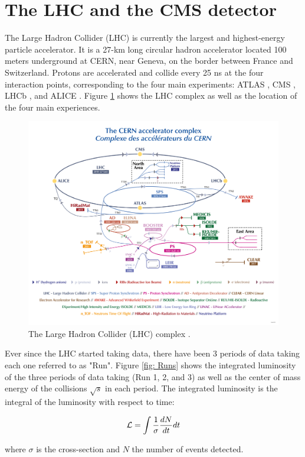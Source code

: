 \section{The LHC and the CMS detector} \label{section: CMS}


The Large Hadron Collider (LHC) is currently the largest and highest-energy particle accelerator. It is a 27-km long circular hadron accelerator located 100 meters underground at CERN, near Geneva, on the border between France and Switzerland. Protons are accelerated and collide every 25 ns at the four interaction points, corresponding to the four main experiments: ATLAS \cite{ATLAS}, CMS \cite{CMS}, LHCb \cite{LHCb}, and ALICE \cite{ALICE}. Figure \ref{fig: LHC} shows the  LHC complex as well as the location of the four main experiences.

\begin{figure}[hbt]
    \centering
    \includegraphics[width=0.7\linewidth]{Images/3.CMS/CCC-v2022.png}
    \caption{The Large Hadron Collider (LHC) complex \cite{LHCFIG}.}
    \label{fig: LHC}
\end{figure}

Ever since the LHC started taking data, there have been 3 periods of data taking each one referred to as "Run". Figure \ref{fig: Runs} shows the integrated luminosity of the three periods of data taking (Run 1, 2, and 3) as well as the center of mass energy of the collisions $\sqrt{s}$ in each period. The integrated luminosity \lumi is the integral of the luminosity with respect to time:

\begin{equation}
    {\ensuremath{\mathcal{L}}}= \int \frac{1}{\sigma} \frac{dN}{dt} dt
\end{equation}

\noindent where $\sigma$ is the cross-section and $N$ the number of events detected.

